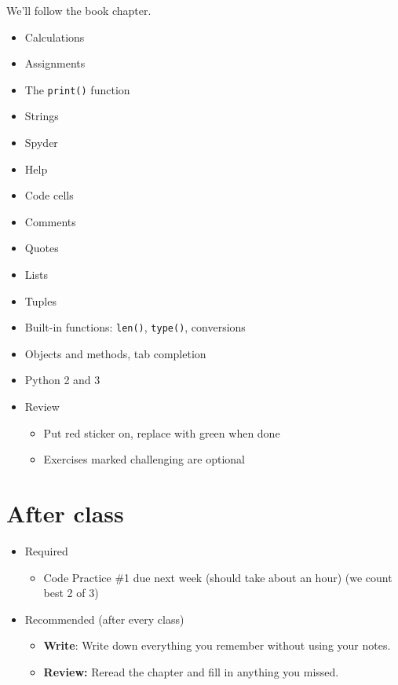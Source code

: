\documentclass[11pt]{article}
\begin{document}
We'll follow the book chapter.
\begin{itemize}
\item Calculations %
\item Assignments
\item The {\tt print()} function
\item Strings
\item Spyder
\item Help
\item Code cells
\item Comments
\item Quotes
\item Lists
\item Tuples
\item Built-in functions:  {\tt len()}, {\tt type()}, conversions
\item Objects and methods, tab completion
\item Python 2 and 3
\item Review
\begin{itemize}
\item Put red sticker on, replace with green when done
\item Exercises marked challenging are optional
\end{itemize}
\end{itemize}

\section*{After class}

\begin{itemize}
\item Required
\begin{itemize}
\item Code Practice \#1 due next week (should take about an hour) (we count best 2 of 3)
\end{itemize}
\item Recommended (after every class) 
\begin{itemize}
\item {\bf Write}:  Write down everything you remember without using your notes.  
\item {\bf Review:} Reread the chapter and fill in anything you missed.
\end{itemize}
\end{itemize}


\end{document}
